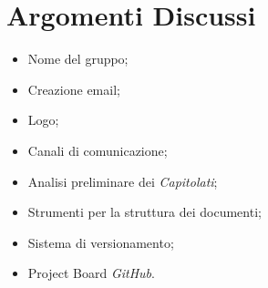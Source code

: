 \section{Argomenti Discussi}
	\begin{itemize}
		\item Nome del gruppo;
		\item Creazione email;
		\item Logo;
		\item Canali di comunicazione;
		\item Analisi preliminare dei \textit{Capitolati\glos};
		\item Strumenti per la struttura dei documenti;
		\item Sistema di versionamento;
		\item Project Board \textit{GitHub\glos}.
	\end{itemize}